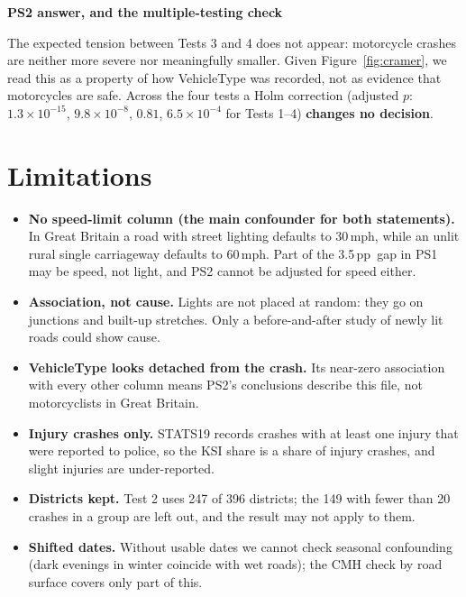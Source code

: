\documentclass[10pt,a4paper,twocolumn]{article}
\newcommand{\minihead}[1]{\par\needspace{8\baselineskip}\smallskip\textbf{#1}\par}
\newcommand{\brkus}{\textunderscore\allowbreak}
\newcommand{\code}[1]{{\ttfamily\let\_\brkus #1}}   %
\newcommand{\pp}{\,pp}
\begin{document}
\minihead{PS2 answer, and the multiple-testing check}
The expected tension between Tests 3 and 4 does not appear: motorcycle crashes are neither more
severe nor meaningfully smaller. Given Figure~\ref{fig:cramer}, we read this as a property of
how \code{Vehicle\_Type} was recorded, not as evidence that motorcycles are safe. Across the four
tests a Holm correction (adjusted $p$: $1.3\times10^{-15}$, $9.8\times10^{-8}$, $0.81$,
$6.5\times10^{-4}$ for Tests 1--4) \textbf{changes no decision}.

\section{Limitations}

\begin{itemize}
  \item \textbf{No speed-limit column (the main confounder for both statements).} In Great
  Britain a road with street lighting defaults to 30\,mph, while an unlit rural single
  carriageway defaults to 60\,mph. Part of the 3.5\pp\ gap in PS1 may be speed, not light, and
  PS2 cannot be adjusted for speed either.
  \item \textbf{Association, not cause.} Lights are not placed at random: they go on junctions
  and built-up stretches. Only a before-and-after study of newly lit roads could show cause.
  \item \textbf{\code{Vehicle\_Type} looks detached from the crash.} Its near-zero association
  with every other column means PS2's conclusions describe this file, not motorcyclists in Great
  Britain.
  \item \textbf{Injury crashes only.} STATS19 records crashes with at least one injury that were
  reported to police, so the KSI share is a share of injury crashes, and slight injuries are
  under-reported.
  \item \textbf{Districts kept.} Test 2 uses 247 of 396 districts; the 149 with fewer than 20
  crashes in a group are left out, and the result may not apply to them.
  \item \textbf{Shifted dates.} Without usable dates we cannot check seasonal confounding (dark
  evenings in winter coincide with wet roads); the CMH check by road surface covers only part of
  this.
\end{itemize}
\end{document}
